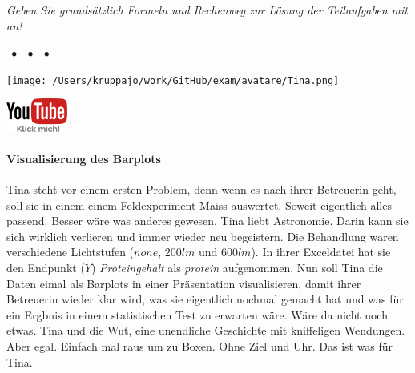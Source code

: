 \documentclass[a4paper, 9pt]{scrartcl}\usepackage[]{graphicx}\usepackage[]{xcolor}
\begin{document}
\textit{Geben Sie grundsätzlich Formeln und Rechenweg zur Lösung der Teilaufgaben mit an!} \\[1Ex]
 

 
\ifcollection
\begin{flushright}
\tiny\vspace{-3Ex}
\textbf{\examinhaltstart}
\exammodulemathstat $\;\bullet$
\exammodulestat $\;\bullet$
\exammodulelanddaten $\;\bullet$
\exammodulestatbbv 
\vspace{-4Ex}
\end{flushright}
\begin{minipage}[t]{0.5\textwidth}
\texttt{[image: /Users/kruppajo/work/GitHub/exam/avatare/Tina.png]}
\end{minipage}
\begin{minipage}[t]{0.5\textwidth}
\hfill
\href{https://youtu.be/UabXe73G-7w}{\includegraphics[width = 2cm]{img/youtube}}
\end{minipage}
\vspace{-3ex}
\fi



\ifcollection
\paragraph{Visualisierung des Barplots}
\fi

Tina steht vor einem ersten Problem, denn wenn es nach ihrer Betreuerin geht, soll sie in einem einem Feldexperiment Maiss auswertet. Soweit eigentlich alles passend. Besser wäre was anderes gewesen. Tina liebt Astronomie. Darin kann sie sich wirklich verlieren und immer wieder neu begeistern. Die Behandlung waren verschiedene Lichtstufen ($none$, $200lm$ und $600lm$). In ihrer Exceldatei hat sie den Endpunkt ($Y$) \textit{Proteingehalt} als \textit{protein} aufgenommen. Nun soll Tina die Daten eimal als Barplots in einer Präsentation visualisieren, damit ihrer Betreuerin wieder klar wird, was sie eigentlich nochmal gemacht hat und was für ein Ergbnis in einem statistischen Test zu erwarten wäre. Wäre da nicht noch etwas. Tina und die Wut, eine unendliche Geschichte mit kniffeligen Wendungen. Aber egal. Einfach mal raus um zu Boxen. Ohne Ziel und Uhr. Das ist was für Tina.
\end{document}
